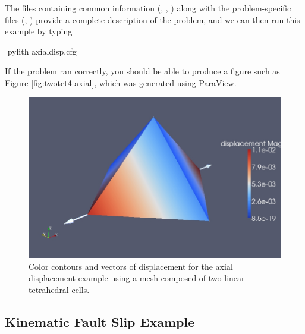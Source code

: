 The files containing common information (,
, ) along with
the problem-specific files (,
) provide a complete description of the
problem, and we can then run this example by typing
\begin{shell}
$$ pylith axialdisp.cfg
\end{shell}
If the problem ran correctly, you should be able to produce a figure
such as Figure \vref{fig:twotet4-axial}, which was generated using
ParaView.

\begin{figure}
  \includegraphics[scale=0.33]{examples/figs/twotet4-axialdisp}
  \caption{Color contours and vectors of displacement for the axial displacement
    example using a mesh composed of two linear tetrahedral cells.}
  \label{fig:twotet4-axial}
\end{figure}


\subsection{Kinematic Fault Slip Example}

